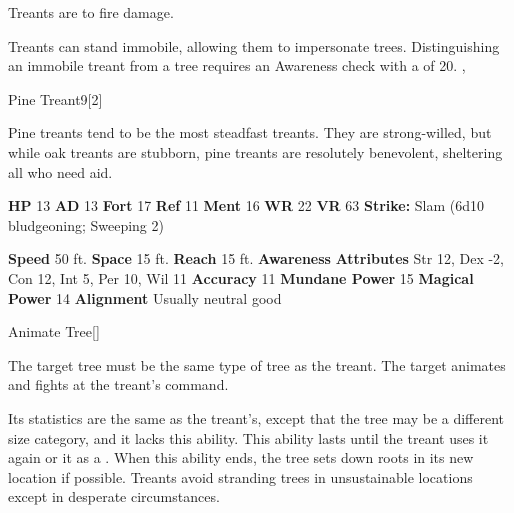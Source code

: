         Treants are  to fire damage.
      
        Treants can stand immobile, allowing them to impersonate trees.
        Distinguishing an immobile treant from a tree requires an Awareness check with a  of 20.
  ,
  \begin{monsubsection}{Pine Treant}{9}[2]
    \vspace{-1em}\vspace{-1em}
    \vspace{0em}

    
         Pine treants tend to be the most steadfast treants.
         They are strong-willed, but while oak treants are stubborn, pine treants are resolutely benevolent, sheltering all who need aid.
      
    

    \begin{spellcontent}
      \begin{spelltargetinginfo}
        \pari \textbf{HP} 13 \monsep
          \textbf{AD} 13 \monsep
          \textbf{Fort} 17 \monsep
          \textbf{Ref} 11 \monsep
          \textbf{Ment} 16
        \pari \textbf{WR} 22 \monsep
        \textbf{VR} 63
        \pari \textbf{Strike:}
            Slam  (6d10 bludgeoning; Sweeping 2)
      \end{spelltargetinginfo}
    \end{spellcontent}
    \begin{monsterfooter}
      \pari \textbf{Speed} 50 ft. \monsep
        \textbf{Space} 15 ft. \monsep
        \textbf{Reach} 15 ft.
      \pari \textbf{Awareness} 
      \pari \textbf{Attributes}
        Str 12, Dex -2,
        Con 12, Int 5,
        Per 10, Wil 11
      \pari \textbf{Accuracy} 11 \monsep
        \textbf{Mundane Power} 15 \monsep
      \textbf{Magical Power} 14
      \pari \textbf{Alignment} Usually neutral good
    \end{monsterfooter}
  \end{monsubsection}
  \begin{freeability}{Animate Tree}[]
      
        The target tree must be the same type of tree as the treant.
        The target animates and fights at the treant's command.

        Its statistics are the same as the treant's, except that the tree may be a different size category, and it lacks this ability.
        This ability lasts until the treant uses it again or  it as a .
        When this ability ends, the tree sets down roots in its new location if possible.
        Treants avoid stranding trees in unsustainable locations except in desperate circumstances.
      
    \end{freeability}
  
